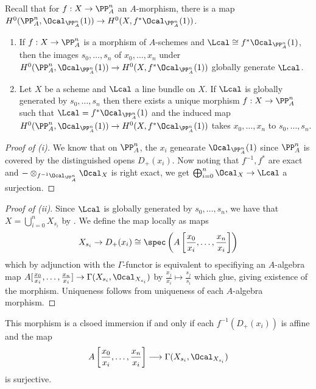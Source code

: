 Recall that for $f:X\to \PP^{n}_{A}$ an $A$-morphism, there is a map $H^{0}(\PP^{n}_{A},\Ocal_{\PP^{n}_{A}}(1))\to H^{0}(X,f^{*}\Ocal_{\PP^{n}_{A}}(1))$. 
\begin{proposition}\label{prop: maps to Pn}
    \begin{enumerate}[label=(\roman*)]
        \item If $f:X\to\PP^{n}_{A}$ is a morphism of $A$-schemes and $\Lcal\cong f^{*}\Ocal_{\PP^{n}_{A}}(1)$, then the images $s_{0},\dots,s_{n}$ of $x_{0},\dots,x_{n}$ under  $H^{0}(\PP^{n}_{A},\Ocal_{\PP^{n}_{A}}(1))\to H^{0}(X,f^{*}\Ocal_{\PP^{n}_{A}}(1))$ globally generate $\Lcal$. 
        \item Let $X$ be a scheme and $\Lcal$ a line bundle on $X$. If $\Lcal$ is globally generated by $s_{0},\dots,s_{n}$ then there exists a unique morphism $f:X\to\PP^{n}_{A}$ such that $\Lcal=f^{*}\Ocal_{\PP^{n}_{A}}(1)$ and the induced map $H^{0}(\PP^{n}_{A},\Ocal_{\PP^{n}_{A}}(1))\to H^{0}(X,f^{*}\Ocal_{\PP^{n}_{A}}(1))$ takes $x_{0},\dots,x_{n}$ to $s_{0},\dots,s_{n}$. 
    \end{enumerate}
\end{proposition}
\begin{proof}[Proof of (i)]
    We know that on $\PP^{n}_{A}$, the $x_{i}$ genearate $\Ocal_{\PP^{n}_{A}}(1)$ since $\PP^{n}_{A}$ is covered by the distinguished opens $D_{+}(x_{i})$. Now noting that $f^{-1},f^{*}$ are exact and $-\otimes_{f^{-1}\Ocal_{\PP^{n}_{A}}}\Ocal_{X}$ is right exact, we get $\bigoplus_{i=0}^{n}\Ocal_{X}\to\Lcal$ a surjection. 
\end{proof}
\begin{proof}[Proof of (ii)]
    Since $\Lcal$ is globally generated by $s_{0},\dots,s_{n}$, we have that $X=\bigcup_{i=0}^{n}X_{s_{i}}$ by . We define the map locally as maps 
    $$X_{s_{i}}\to D_{+}(x_{i})\cong\spec\left(A\left[\frac{x_{0}}{x_{i}},\dots,\frac{x_{n}}{x_{i}}\right]\right)$$
    which by adjunction with the $\Gamma$-functor is equivalent to specifiying an $A$-algebra map $A[\frac{x_{0}}{x_{i}},\dots,\frac{x_{n}}{x_{i}}]\to\Gamma(X_{s_{i}},\Ocal_{X_{s_{i}}})$ by $\frac{x_{j}}{x_{i}}\mapsto\frac{s_{j}}{s_{i}}$ which glue, giving existence of the morphism. Uniqueness follows from uniqueness of each $A$-algebra morphism. 
\end{proof}
\begin{remark}
    This morphism is a clsoed immersion if and only if each $f^{-1}(D_{+}(x_{i}))$ is affine and the map 
    $$A\left[\frac{x_{0}}{x_{i}},\dots,\frac{x_{n}}{x_{i}}\right]\longrightarrow\Gamma(X_{s_{i}},\Ocal_{X_{s_{i}}})$$
    is surjective. 
\end{remark}
